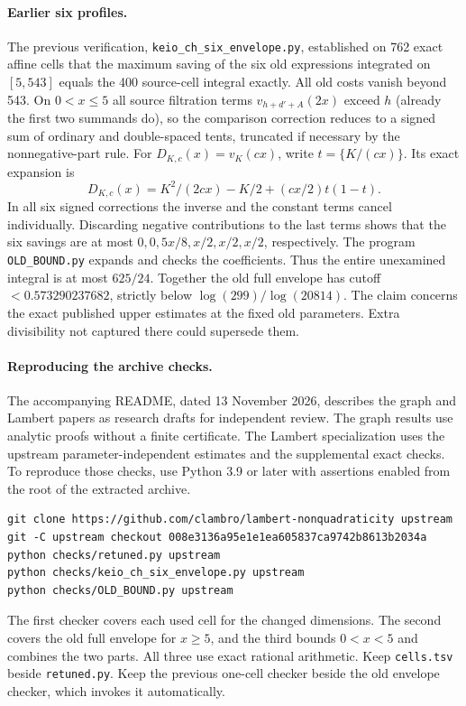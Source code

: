 \documentclass[11pt,a4paper]{article}
\begin{document}
\paragraph{Earlier six profiles.}
The previous verification, \texttt{keio\_\allowbreak{}ch\_\allowbreak{}six\_\allowbreak{}envelope.py}, established
on 762 exact affine cells that the maximum saving of the six old expressions
integrated on $[5,543]$ equals the 400 source-cell integral exactly. All old
costs vanish beyond 543. On $0<x\le5$ all source filtration terms
$v_{h+d'+A}(2x)$ exceed $h$ (already the first two summands do), so the
comparison correction reduces to a signed sum of ordinary and double-spaced
tents, truncated if necessary by the nonnegative-part rule. For
$D_{K,c}(x)=v_K(cx)$, write $t=\{K/(cx)\}$. Its exact expansion is
\[
 D_{K,c}(x)=K^2/(2cx)-K/2+(cx/2)t(1-t) .
\]
In all six signed corrections the inverse and the constant terms cancel
individually. Discarding negative contributions to the last terms shows
that the six savings are at most $0,0,5x/8,x/2,x/2,x/2$, respectively.
The program \texttt{OLD\_BOUND.py} expands and checks the coefficients.
Thus the entire unexamined integral is at most $625/24$. Together the old
full envelope has cutoff $<0.573290237682$, strictly below
$\log(299)/\log(20814)$. The claim concerns the exact published upper
estimates at the fixed old parameters. Extra divisibility not captured
there could supersede them.

\paragraph{Reproducing the archive checks.}
The accompanying README, dated 13 November 2026, describes the graph and
Lambert papers as research drafts for independent review. The graph
results use analytic proofs without a finite certificate. The Lambert
specialization uses the upstream parameter-independent estimates and the
supplemental exact checks. To reproduce those checks, use Python 3.9 or
later with assertions enabled from the root of the extracted archive.
\begin{verbatim}
git clone https://github.com/clambro/lambert-nonquadraticity upstream
git -C upstream checkout 008e3136a95e1e1ea605837ca9742b8613b2034a
python checks/retuned.py upstream
python checks/keio_ch_six_envelope.py upstream
python checks/OLD_BOUND.py upstream
\end{verbatim}
The first checker covers each used cell for the changed dimensions. The
second covers the old full envelope for $x\ge5$, and the third bounds
$0<x<5$ and combines the two parts. All three use exact rational arithmetic.
Keep \texttt{cells.tsv} beside \texttt{retuned.py}. Keep the previous
one-cell checker beside the old envelope checker, which invokes it
automatically.
\par\endgroup
\end{document}
